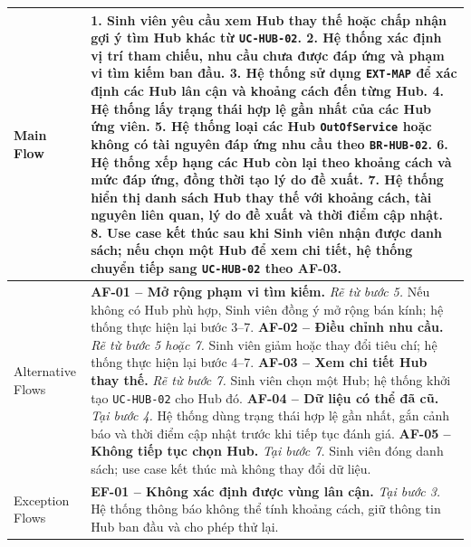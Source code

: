 \begin{longtable}{|L{42mm}|L{102mm}|}
  Main Flow &
    \textbf{1.} Sinh viên yêu cầu xem Hub thay thế hoặc chấp nhận gợi ý tìm Hub khác từ \texttt{UC-HUB-02}.\newline
    \textbf{2.} Hệ thống xác định vị trí tham chiếu, nhu cầu chưa được đáp ứng và phạm vi tìm kiếm ban đầu.\newline
    \textbf{3.} Hệ thống sử dụng \texttt{EXT-MAP} để xác định các Hub lân cận và khoảng cách đến từng Hub.\newline
    \textbf{4.} Hệ thống lấy trạng thái hợp lệ gần nhất của các Hub ứng viên.\newline
    \textbf{5.} Hệ thống loại các Hub \texttt{OutOfService} hoặc không có tài nguyên đáp ứng nhu cầu theo \texttt{BR-HUB-02}.\newline
    \textbf{6.} Hệ thống xếp hạng các Hub còn lại theo khoảng cách và mức đáp ứng, đồng thời tạo lý do đề xuất.\newline
    \textbf{7.} Hệ thống hiển thị danh sách Hub thay thế với khoảng cách, tài nguyên liên quan, lý do đề xuất và thời điểm cập nhật.\newline
    \textbf{8.} Use case kết thúc sau khi Sinh viên nhận được danh sách; nếu chọn một Hub để xem chi tiết, hệ thống chuyển tiếp sang \texttt{UC-HUB-02} theo AF-03.\\\hline
  Alternative Flows &
    \textbf{AF-01 -- Mở rộng phạm vi tìm kiếm.} \textit{Rẽ từ bước 5.} Nếu không có Hub phù hợp, Sinh viên đồng ý mở rộng bán kính; hệ thống thực hiện lại bước 3--7.\newline
    \textbf{AF-02 -- Điều chỉnh nhu cầu.} \textit{Rẽ từ bước 5 hoặc 7.} Sinh viên giảm hoặc thay đổi tiêu chí; hệ thống thực hiện lại bước 4--7.\newline
    \textbf{AF-03 -- Xem chi tiết Hub thay thế.} \textit{Rẽ từ bước 7.} Sinh viên chọn một Hub; hệ thống khởi tạo \texttt{UC-HUB-02} cho Hub đó.\newline
    \textbf{AF-04 -- Dữ liệu có thể đã cũ.} \textit{Tại bước 4.} Hệ thống dùng trạng thái hợp lệ gần nhất, gắn cảnh báo và thời điểm cập nhật trước khi tiếp tục đánh giá.\newline
    \textbf{AF-05 -- Không tiếp tục chọn Hub.} \textit{Tại bước 7.} Sinh viên đóng danh sách; use case kết thúc mà không thay đổi dữ liệu.\\\hline
  Exception Flows &
    \textbf{EF-01 -- Không xác định được vùng lân cận.} \textit{Tại bước 3.} Hệ thống thông báo không thể tính khoảng cách, giữ thông tin Hub ban đầu và cho phép thử lại.\newline

\end{longtable}
